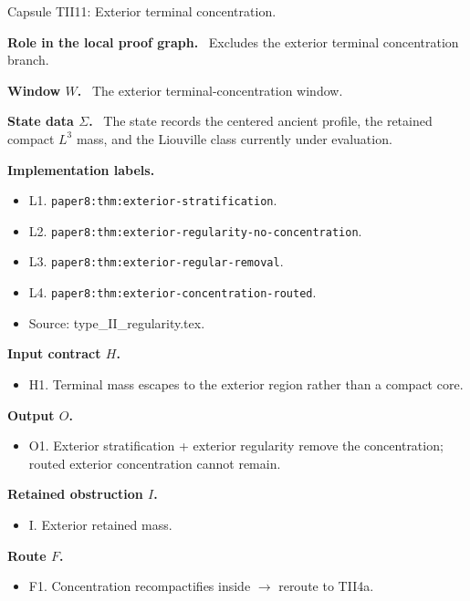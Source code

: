\documentclass[11pt]{amsart}
\newcommand{\capsulefield}[1]{\par\smallskip\noindent\textbf{#1.}\ }
\begin{document}
\begin{proofcapsule}{Capsule TII11: Exterior terminal concentration.}
  \capsulefield{Role in the local proof graph}
  Excludes the exterior terminal concentration branch.

  \capsulefield{Window \(W\)}
The exterior terminal-concentration window.

  \capsulefield{State data \(\Sigma\)}
The state records the centered ancient profile, the retained compact $L^3$ mass, and the Liouville class currently under evaluation.

  \capsulefield{Implementation labels}
  \begin{itemize}[leftmargin=1.8em]
  \item L1. \texttt{paper8:thm:exterior-stratification}.
  \item L2. \texttt{paper8:thm:exterior-regularity-no-concentration}.
  \item L3. \texttt{paper8:thm:exterior-regular-removal}.
  \item L4. \texttt{paper8:thm:exterior-concentration-routed}.
  \item Source: type\_II\_regularity.tex.
  \end{itemize}

  \capsulefield{Input contract \(H\)}
  \begin{itemize}[leftmargin=1.8em]
  \item H1. Terminal mass escapes to the exterior region rather than a compact core.
  \end{itemize}

  \capsulefield{Output \(O\)}
  \begin{itemize}[leftmargin=1.8em]
  \item O1. Exterior stratification + exterior regularity remove the concentration; routed exterior concentration cannot remain.
  \end{itemize}

  \capsulefield{Retained obstruction \(I\)}
  \begin{itemize}[leftmargin=1.8em]
  \item I. Exterior retained mass.
  \end{itemize}

  \capsulefield{Route \(F\)}
  \begin{itemize}[leftmargin=1.8em]
  \item F1. Concentration recompactifies inside $\to$ reroute to TII4a.
  \end{itemize}


\end{proofcapsule}
\end{document}
